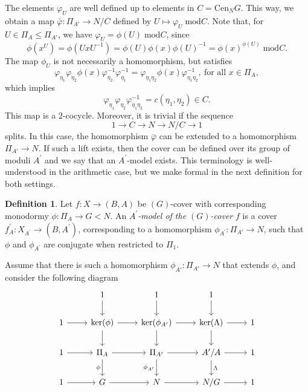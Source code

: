 \documentclass[10pt]{amsart}
\theoremstyle{definition}
\newtheorem{definition}[theorem]{Definition}
\renewcommand{\mod}{{\;\mathrm{mod}}}
\begin{document}
The elements $\varphi_U$ are well defined up to elements in $C=\mathrm{Cen}_NG$.
This way, we obtain a map $\bar{\varphi}\colon \Pi_{A'} \rightarrow  N/C$ defined by $U \mapsto \varphi_U \mod C$. 
Note that, for $U \in \Pi_A \leq \Pi_{A'}$, we have $\varphi_U= \phi(U) \mod C$, since
\[
  \phi(x^U)= \phi(U x U^{-1}) = \phi(U) \phi(x) \phi(U)^{-1} = \phi(x)^{\phi(U)} \mod C.
\] 
The map $\phi_U$ is not necessarily a homomorphism, but satisfies
\[
  \varphi_{\eta_1} \varphi_{\eta_2} \phi(x) \varphi_{\eta_2}^{-1} \varphi_{\eta_1}^{-1}  = \varphi_{\eta_1\eta_2} \phi(x) \varphi_{\eta_1 \eta_2}^{-1}, \ \text{for all } x \in \Pi_{A},
\]
which implies
\[
  \varphi_{\eta_1} \varphi_{\eta_2}  \varphi_{\eta_1 \eta_2}^{-1} =c(\eta_1, \eta_2) \in C. 
\]
This map is a $2$-cocycle. Moreover, it is trivial if the sequence 
\[
  1 \rightarrow C \rightarrow N \rightarrow N/C \rightarrow 1
\]
splits.
In this case, the homomorphism  $\bar{\varphi}$ can be extended to a homomorphism $\Pi_{A'} \rightarrow N$. 
If such a lift exists, then the cover can be defined over its group of moduli $A^\prime$ and we say that an $A^\prime$-model exists. This terminology is well-understood in the arithmetic case, but we make formal in the next definition for both settings.

\begin{definition}{\label{def:Amodel}}
Let  $f\colon X \rightarrow (B,A)$ be $(G)$-cover with corresponding monodormy $\phi \colon \Pi_A \rightarrow G < N$.
  An {\em $A^\prime$-model of the $(G)$-cover} $f$ is a cover $f_A^{\prime} \colon X_{A^\prime}\rightarrow (B,A^\prime)$, corresponding to a homomorphism $\phi_{A^\prime}\colon\Pi_{A'} \rightarrow N$, such that $\phi$ and $\phi_{A^\prime}$ are conjugate when restricted to $\Pi_1$.
\end{definition}

 
Assume that there is such a homomorphism  $\phi_{A'}\colon \Pi_{A'} \rightarrow N$
that extends $\phi$, and consider the following diagram 
\[
\begin{tikzcd}
& 1 \arrow[d] & 1 \arrow[d] & 1 \arrow[d] \\
1 \arrow[r] 
  & \ker(\phi) \arrow[d] \arrow[r] 
  & \ker(\phi_{A'}) \arrow[d] \arrow[r] 
  & \ker(\Lambda) \arrow[d] \arrow[r] 
  & 1 \\
1 \arrow[r] 
  & \Pi_A \arrow[d, "\phi"'] \arrow[r] 
  & \Pi_{A'} \arrow[d, "\phi_{A'}"'] \arrow[r] 
  & A'/A \arrow[d, "\Lambda"] \arrow[r] 
  & 1 \\
1 \arrow[r] 
  & G \arrow[r] 
  & N \arrow[r] 
  & N/G \arrow[r] 
  & 1
\end{tikzcd}
\]
\end{document}
